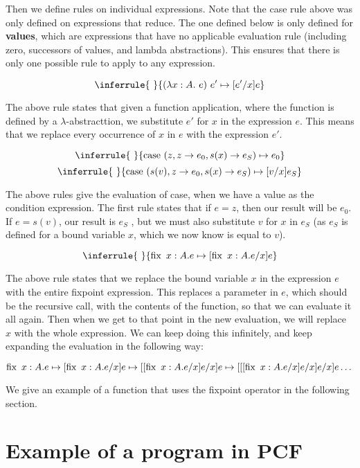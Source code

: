 Then we define rules on individual expressions. Note that the case rule above was only defined on expressions that reduce. The one defined below is only defined for \textbf{values}, which are expressions that have no applicable evaluation rule (including zero, successors of values, and lambda abstractions). This ensures that there is only one possible rule to apply to any expression.



$$
\inferrule{ \ }
 {(\lambda x: A .\ e) \ e' \mapsto [e'/x]e}
$$

The above rule states that given a function application, where the function is defined by a $\lambda$-abstracttion, we substitute $e'$ for $x$ in the expression $e$. This means that we replace every occurrence of $x$ in $e$ with the expression $e'$.

$$
\inferrule{ \ }
{\case \ (z, z \to e_0 , s(x) \to e_S) \mapsto e_0}
$$
$$
\inferrule{ \ }
{\case \ (s(v), z \to e_0 , s(x) \to e_S) \mapsto [v/x]e_S}
$$

The above rules give the evaluation of case, when we have a value as the condition expression. The first rule states that if $e = z$, then our result will be $e_0$. If $e = s(v)$, our result is $e_S$ , but we must also substitute $v$ for $x$ in $e_S$ (as $e_S$ is defined for a bound variable $x$, which we now know is equal to $v$).

$$
\inferrule{ \ }
{\fix \ x:A. e \mapsto [\fix \ x:A. e/x]e}
$$

The above rule states that we replace the bound variable $x$ in the expression $e$ with the entire fixpoint expression. This replaces a parameter in $e$, which should be the recursive call, with the contents of the function, so that we can evaluate it all again. Then when we get to that point in the new evaluation, we will replace $x$ with the whole expression. We can keep doing this infinitely, and keep expanding the evaluation in the following way:

\[ \operatorname{fix} \ x:A. e \mapsto [\operatorname{fix} \ x:A. e/x]e \mapsto 
[[\operatorname{fix} \ x:A. e/x]e/x]e
\mapsto
[[[\operatorname{fix} \ x:A. e/x]e/x]e/x]e \dots \]

We give an example of a function that uses the fixpoint operator in the following section.

\section{Example of a program in PCF}




